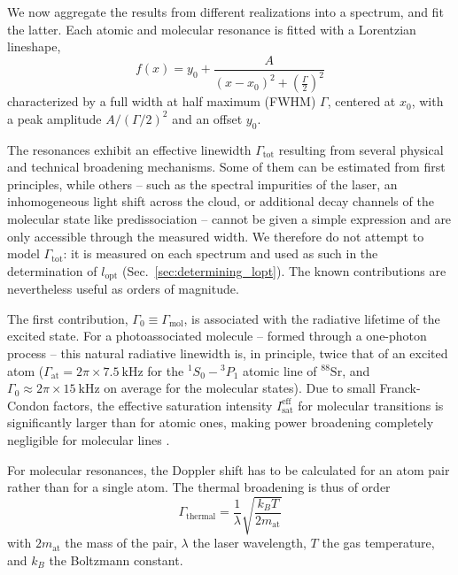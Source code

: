 We now aggregate the results from different realizations into a spectrum, and fit the
latter. Each atomic and molecular resonance is fitted with a Lorentzian lineshape,
\begin{equation}
    f(x) = y_0 + \frac{A}{(x-x_0)^2 + \left(\frac{\Gamma}{2}\right)^2}
\end{equation}
characterized by a full width at half maximum (FWHM) $\Gamma$, centered at $x_0$,
with a peak amplitude $A / (\Gamma/2)^2$ and an offset $y_0$.

The resonances exhibit an effective linewidth $\Gamma_{\text{tot}}$ resulting from
several physical and technical broadening mechanisms. Some of them can be
estimated from first principles, while others -- such as the spectral impurities
of the laser, an inhomogeneous light shift across the cloud, or additional decay
channels of the molecular state like predissociation -- cannot be given a simple
expression and are only accessible through the measured width. We therefore do
not attempt to model $\Gamma_{\text{tot}}$: it is measured on each spectrum and used
as such in the determination of $l_{\text{opt}}$ (Sec.~\ref{sec:determining_lopt}).
The known contributions are nevertheless useful as orders of magnitude.

The first contribution, $\Gamma_0 \equiv \Gamma_{\text{mol}}$, is associated with the radiative lifetime of the
excited state. For a photoassociated molecule -- formed through a one-photon process --
this natural radiative linewidth is, in principle, twice that of an excited atom
($\Gamma_{\text{at}} = 2\pi \times 7.5~\text{kHz}$ for the $^1S_0 - {}^3P_1$ atomic line of
$^{88}\text{Sr}$, and $\Gamma_0 \approx 2\pi\times15~\text{kHz}$ on average for the molecular
states). Due to small Franck-Condon factors, the effective saturation intensity
$I_{\text{sat}}^{\text{eff}}$ for molecular transitions is significantly larger than for
atomic ones, making power broadening completely negligible for molecular lines
\cite{zelevinsky_narrow_2006}.

For molecular resonances, the Doppler shift has to be calculated for an atom pair rather
than for a single atom. The thermal broadening is thus of order
\begin{equation}
\Gamma_{\text{thermal}} = \frac{1}{\lambda}\sqrt{\frac{k_B T}{2m_{\text{at}}}}
\end{equation}
with $2m_{\text{at}}$ the mass of the pair, $\lambda$ the laser wavelength, $T$ the gas
temperature, and $k_B$ the Boltzmann constant.

